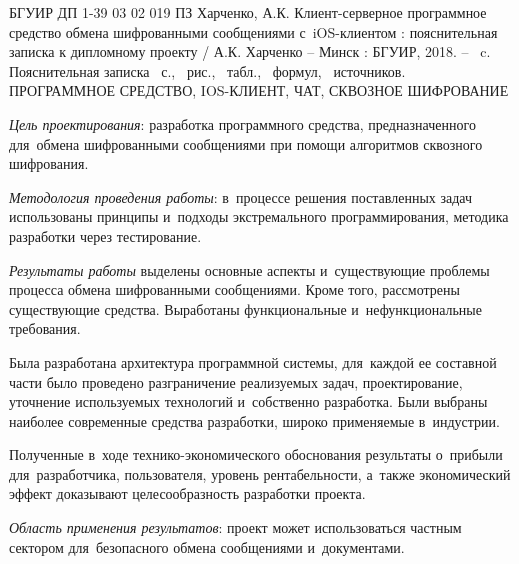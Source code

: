 \thispagestyle{empty}

\setcounter{page}{4}


БГУИР ДП 1-39 03 02 019 ПЗ
\bigbreak
Харченко, А.К. Клиент-серверное программное средство обмена шифрованными сообщениями с~iOS-клиентом : пояснительная записка к дипломному проекту / А.К. Харченко -- Минск : БГУИР, 2018. -- \totalpages~c.
\bigbreak
Пояснительная записка \totalpages~с., \totfig{}~рис., \tottab{}~табл., \toteq{}~формул, \totref{}~источников.
\bigbreak
\MakeUppercase{Программное средство, iOS-клиент, чат, сквозное шифрование}
\bigbreak

\textit{Цель проектирования}: разработка программного средства, предназначенного для~обмена шифрованными сообщениями при помощи алгоритмов сквозного шифрования. 

\textit{Методология проведения работы}: в~процессе решения поставленных задач использованы принципы и~подходы экстремального программирования, методика разработки через тестирование.

\textit{Результаты работы} выделены основные аспекты и~существующие проблемы процесса обмена шифрованными сообщениями. Кроме того, рассмотрены существующие средства. Выработаны функциональные и~нефункциональные требования.

Была разработана архитектура программной системы, для~каждой ее составной части было проведено разграничение реализуемых задач, проектирование, уточнение используемых технологий и~собственно разработка. Были выбраны наиболее современные средства разработки, широко применяемые в~индустрии. 

Полученные в~ходе технико-экономического обоснования результаты о~прибыли для~разработчика, пользователя, уровень рентабельности, а~также экономический эффект доказывают целесообразность разработки про\-екта.

\textit{Область применения результатов}: проект может использоваться частным сектором для~безопасного обмена сообщениями и~документами.